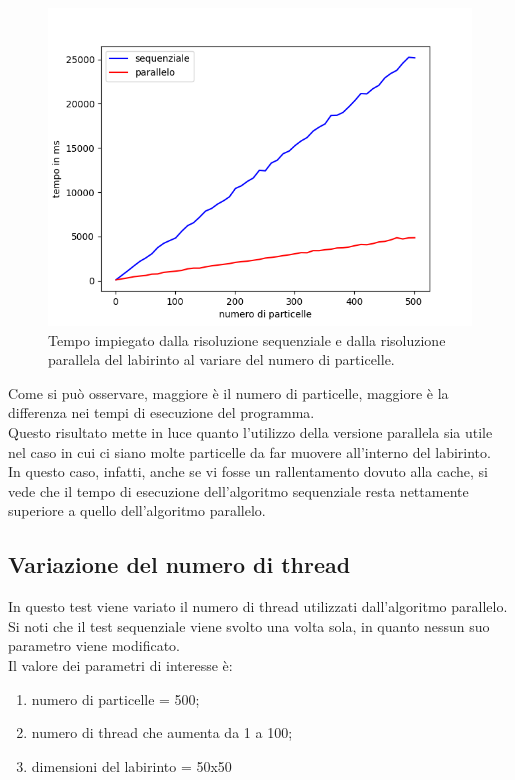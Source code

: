 \documentclass[10pt,twocolumn,letterpaper]{article}
\begin{document}
\begin{figure}[H]
\includegraphics[width=1.1\linewidth]{test/particlesTest/result.png}
\caption{\small Tempo impiegato dalla risoluzione sequenziale e dalla risoluzione parallela del labirinto al variare del numero di particelle.}
\label{t2}
\end{figure}

Come si può osservare, maggiore è il numero di particelle, maggiore è la differenza nei tempi di esecuzione del programma.\\
Questo risultato mette in luce quanto l'utilizzo della versione parallela sia utile nel caso in cui ci siano molte particelle da far muovere all'interno del labirinto.\\
In questo caso, infatti, anche se vi fosse un rallentamento dovuto alla cache, si vede che il tempo di esecuzione dell'algoritmo sequenziale resta nettamente superiore a quello dell'algoritmo parallelo.

\subsection{Variazione del numero di thread}

In questo test viene variato il numero di thread utilizzati dall'algoritmo parallelo. Si noti che il test sequenziale viene svolto una volta sola, in quanto nessun suo parametro viene modificato.\\
Il valore dei parametri di interesse è:
\begin{enumerate}[-]
\item{numero di particelle = 500;}
\item{numero di thread che aumenta da 1 a 100;}
\item{dimensioni del labirinto = 50x50}
\end{enumerate}
\end{document}
